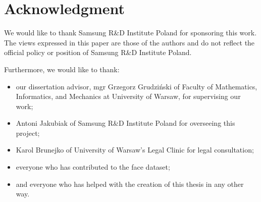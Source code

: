 \section*{Acknowledgment}
We would like to thank Samsung R\&D Institute Poland for sponsoring this work.
The views expressed in this paper are those of the authors and do not reflect
the official policy or position of Samsung R\&D Institute Poland.

\bigskip \noindent
Furthermore, we would like to thank:
\begin{itemize}
    \item our dissertation advisor,  mgr Grzegorz Grudziński of Faculty of Mathematics,
          Informatics, and Mechanics at University of Warsaw, for supervising our work;
    \item Antoni Jakubiak of Samsung R\&D Institute Poland for overseeing this project;
    \item Karol Brunejko of University of Warsaw's Legal Clinic for legal consultation;
    \item everyone who has contributed to the face dataset;
    \item and everyone who has helped with the creation of this thesis in any other way.
\end{itemize}
